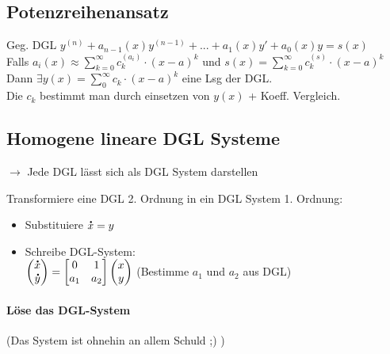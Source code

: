 \documentclass[6pt,a4paper]{scrartcl}
\newcommand{\mat}[1]{\ensuremath{\begin{bmatrix} #1 \end{bmatrix}}}				%
\newcommand{\vect}[1]{\ensuremath{\begin{pmatrix} #1 \end{pmatrix}}}			%
\newcommand{\svdots}{\ensuremath{\olddot :}}													%
\let\olddot = \dot
\renewcommand{\vec}[1]{\ensuremath{\underline{\boldsymbol {#1}}}}
\renewcommand*{\dot}[1]{\accentset{\mbox{\textrm{\large\bfseries .}} }{#1}}
\newcommand{\ra}[0]{\ensuremath{\rightarrow}} 									%
\begin{document}
\begin{multicols}{4}
	
	\subsection{Potenzreihenansatz}
	Geg. DGL $y^{(n)} + a_{n-1}(x)y^{(n-1)} + ... + a_1(x)y' + a_0(x)y = s(x)$\\
	Falls $a_i(x) \approx \sum\limits_{k=0}^\infty c_k^{(a_i)} \cdot (x-a)^k$ und $s(x) = \sum\limits_{k = 0}^{\infty} c_k^{(s)} \cdot (x-a)^k$\\  
	Dann $\exists y(x) = \sum\limits_{0}^\infty c_k \cdot (x-a)^k$ eine Lsg der DGL. \\
	Die $c_k$ bestimmt man durch einsetzen von $y(x)$ + Koeff. Vergleich.
	

	\subsection{Homogene lineare DGL Systeme}
	 $\ra$ Jede DGL lässt sich als DGL System darstellen
	
	Transformiere eine DGL 2. Ordnung in ein DGL System 1. Ordnung:
	\begin{itemize}
		\item Substituiere $\dot x = y$
		\item Schreibe DGL-System: \\
			$\vect{\dot x \\  \dot y} = \mat{ 0 & 1 \\ a_1 & a_2} \vect{x \\ y}$ (Bestimme $a_1$ und $a_2$ aus DGL)
	\end{itemize}
	
	\paragraph{Löse das DGL-System} (Das System ist ohnehin an allem Schuld ;) )
	


\end{multicols}
\end{document}
